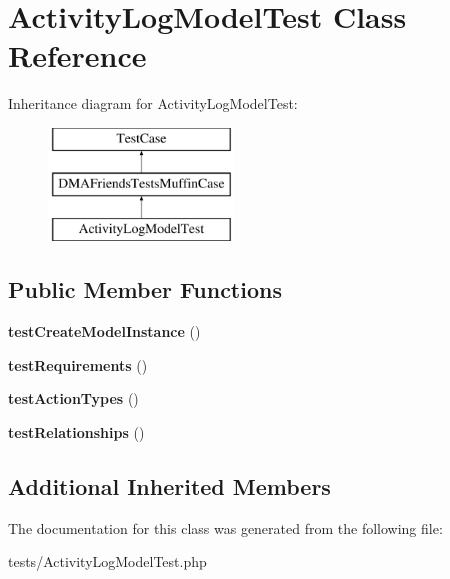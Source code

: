 \hypertarget{classActivityLogModelTest}{\section{Activity\-Log\-Model\-Test Class Reference}
\label{classActivityLogModelTest}
}
Inheritance diagram for Activity\-Log\-Model\-Test\-:\begin{figure}[H]
\begin{center}
\leavevmode
\includegraphics[height=3.000000cm]{d0/d34/classActivityLogModelTest}
\end{center}
\end{figure}
\subsection*{Public Member Functions}
\begin{DoxyCompactItemize}
\item 
\hypertarget{classActivityLogModelTest_a81d1f1451b8d3534182d516088182444}{{\bfseries test\-Create\-Model\-Instance} ()}\label{classActivityLogModelTest_a81d1f1451b8d3534182d516088182444}

\item 
\hypertarget{classActivityLogModelTest_ab52cddaee55d6cb0e83d931726ec4f09}{{\bfseries test\-Requirements} ()}\label{classActivityLogModelTest_ab52cddaee55d6cb0e83d931726ec4f09}

\item 
\hypertarget{classActivityLogModelTest_a946f506f3f5171bf402f89438b0f738a}{{\bfseries test\-Action\-Types} ()}\label{classActivityLogModelTest_a946f506f3f5171bf402f89438b0f738a}

\item 
\hypertarget{classActivityLogModelTest_a154483890f56ef567901b8190ba96abb}{{\bfseries test\-Relationships} ()}\label{classActivityLogModelTest_a154483890f56ef567901b8190ba96abb}

\end{DoxyCompactItemize}
\subsection*{Additional Inherited Members}


The documentation for this class was generated from the following file\-:\begin{DoxyCompactItemize}
\item 
tests/Activity\-Log\-Model\-Test.\-php\end{DoxyCompactItemize}
